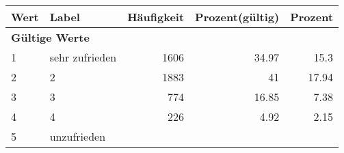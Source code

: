      \begin{longtable}{lXrrr}
     \toprule
     \textbf{Wert} & \textbf{Label} & \textbf{Häufigkeit} & \textbf{Prozent(gültig)} & \textbf{Prozent} \\
     \endhead
     \midrule
     \multicolumn{5}{l}{\textbf{Gültige Werte}}\\

     1 &
     \multicolumn{1}{X}{ sehr zufrieden   } &


       \num{1606} &
       \num[round-mode=places,round-precision=2]{34,97} &
         \num[round-mode=places,round-precision=2]{15,3} \\

     2 &
     \multicolumn{1}{X}{ 2   } &


       \num{1883} &
       \num[round-mode=places,round-precision=2]{41} &
         \num[round-mode=places,round-precision=2]{17,94} \\

     3 &
     \multicolumn{1}{X}{ 3   } &


       \num{774} &
       \num[round-mode=places,round-precision=2]{16,85} &
         \num[round-mode=places,round-precision=2]{7,38} \\

     4 &
     \multicolumn{1}{X}{ 4   } &


       \num{226} &
       \num[round-mode=places,round-precision=2]{4,92} &
         \num[round-mode=places,round-precision=2]{2,15} \\

     5 &
     \multicolumn{1}{X}{ unzufrieden   } &



\end{longtable}
